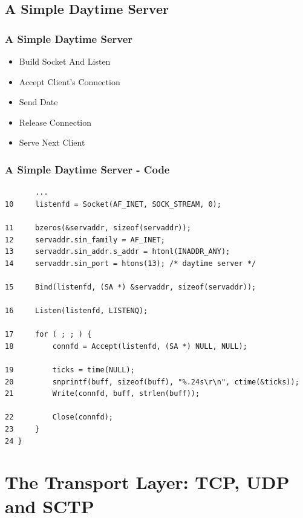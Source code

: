 \documentclass[notes,serif]{beamer}
\begin{document}
\subsection{A Simple Daytime Server}

\begin{frame}
  \frametitle{A Simple Daytime Server}
  \begin{itemize}
  \item Build Socket And Listen
  \item Accept Client's Connection
  \item Send Date
  \item Release Connection
  \item Serve Next Client
  \end{itemize}
\end{frame}

\begin{frame}[containsverbatim]

\frametitle{A Simple Daytime Server - Code}
  {\tiny
  \begin{verbatim}
       ...
10     listenfd = Socket(AF_INET, SOCK_STREAM, 0);

11     bzeros(&servaddr, sizeof(servaddr));
12     servaddr.sin_family = AF_INET;
13     servaddr.sin_addr.s_addr = htonl(INADDR_ANY);
14     servaddr.sin_port = htons(13); /* daytime server */

15     Bind(listenfd, (SA *) &servaddr, sizeof(servaddr));

16     Listen(listenfd, LISTENQ);

17     for ( ; ; ) {
18         connfd = Accept(listenfd, (SA *) NULL, NULL);

19         ticks = time(NULL);
20         snprintf(buff, sizeof(buff), "%.24s\r\n", ctime(&ticks));
21         Write(connfd, buff, strlen(buff));

22         Close(connfd);
23     }
24 }
  \end{verbatim}
  }
\end{frame}

\section{The Transport Layer: TCP, UDP and SCTP}
\end{document}
